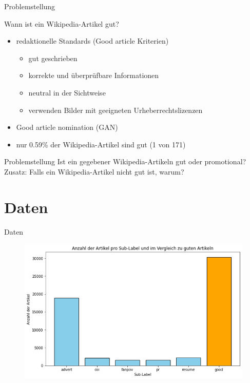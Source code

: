 \documentclass[aspectratio=169]{beamer} %
\begin{document}
\begin{frame}{Problemstellung}
    \begin{block}{Wann ist ein Wikipedia-Artikel gut?}
        \begin{itemize}
            \item redaktionelle Standards (Good article Kriterien)
            \begin{itemize}
                \item gut geschrieben
            
                \item korrekte und \"uberpr\"ufbare Informationen

                \item neutral in der Sichtweise

                \item verwenden Bilder mit geeigneten Urheberrechtslizenzen
            \end{itemize}

            \item Good article nomination (GAN)

            \pause

            \item nur 0.59\% der Wikipedia-Artikel sind gut (1 von 171)
        \end{itemize}
    \end{block}

    \pause

    \begin{block}{Problemstellung}
        Ist ein gegebener Wikipedia-Artikeln gut oder promotional? \\

        Zusatz: Falls ein Wikipedia-Artikel nicht gut ist, warum?
    \end{block}
\end{frame}

\section{Daten}

\begin{frame}{Daten}
    \begin{figure}
        \centering
        \includegraphics[width=0.8\linewidth]{figures/distribution_multiple_classes.png}
    \end{figure}
\end{frame}
\end{document}
